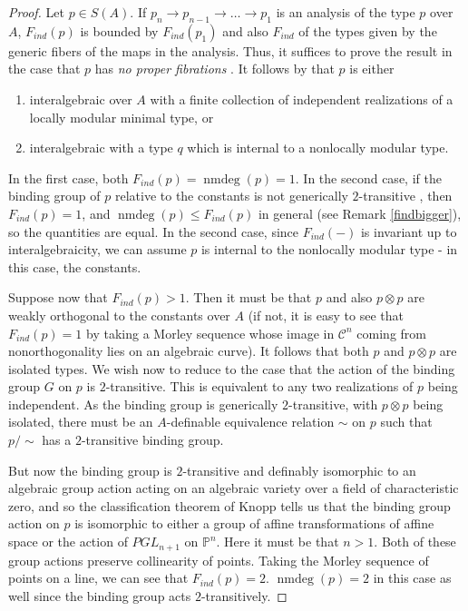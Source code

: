 \documentclass[10pt,a4paper]{amsart}
\def\nmdeg{\mathop{\rm nmdeg}}
\def\nmdeg{\operatorname{nmdeg}}
\theoremstyle{definition}
\theoremstyle{remark}
\newcommand{\m}{\mathbb }
\newcommand{\mc}{\mathcal }
\numberwithin{equation}{section}
\begin{document}
\begin{proof}
Let $p \in S(A)$. If $p_n \rightarrow p_{n-1} \rightarrow \ldots \rightarrow p_1$ is an analysis of the type $p$ over $A$, $F_{ind} (p)$ is bounded by $F_{ind} (p_1)$ and also $F_{ind}$ of the types given by the generic fibers of the maps in the analysis. Thus, it suffices to prove the result in the case that $p$ has \emph{no proper fibrations} \cite[Definition 2.1]{moosa2014some}. It follows by \cite[Proposition 2.3]{moosa2014some} that $p$ is either 
\begin{enumerate}
    \item interalgebraic over $A$ with a finite collection of independent realizations of a locally modular minimal type, or 
    \item interalgebraic with a type $q$ which is internal to a nonlocally modular type. 
\end{enumerate}
    In the first case, both $F_{ind} (p)= \nmdeg{(p)} =1$. In the second case, if the binding group of $p$ relative to the constants is not generically $2$-transitive \cite[for the defintion of generic transitivity]{freitag2023bounding}, then $F_{ind}(p) = 1$, and $\nmdeg(p) \leq F_{ind} (p) $ in general (see Remark \ref{findbigger}), so the quantities are equal. In the second case, since $F_{ind} (-) $ is invariant up to interalgebraicity, we can assume $p$ is internal to the nonlocally modular type - in this case, the constants. 

    Suppose now that $F_{ind} (p) >1$. Then it must be that $p$ and also $p \otimes p$ are weakly orthogonal to the constants over $A$ (if not, it is easy to see that $F_{ind} (p) =1$ by taking a Morley sequence whose image in $\mc C^n$ coming from nonorthogonality lies on an algebraic curve). It follows that both $p$ and $p \otimes p$ are isolated types. We wish now to reduce to the case that the action of the binding group $G$ on $p$ is $2$-transitive. This is equivalent to any two realizations of $p$ being independent. As the binding group is generically $2$-transitive, with $p \otimes p$ being isolated, there must be an $A$-definable equivalence relation $\sim$ on $p$ such that $p/ \sim$ has a $2$-transitive binding group. 

    But now the binding group is $2$-transitive and definably isomorphic to an algebraic group action acting on an algebraic variety over a field of characteristic zero, and so the classification theorem of Knopp \cite{knop1983mehrfach} tells us that the binding group action on $p$ is isomorphic to either a group of affine transformations of affine space or the action of $PGL_{n+1}$ on $\m P^n.$ Here it must be that $n>1.$ Both of these group actions preserve collinearity of points. Taking the Morley sequence of points on a line, we can see that $F_{ind} (p) =2.$ $\nmdeg(p)=2$ in this case as well since the binding group acts $2$-transitively. 
\end{proof}



\end{document}
